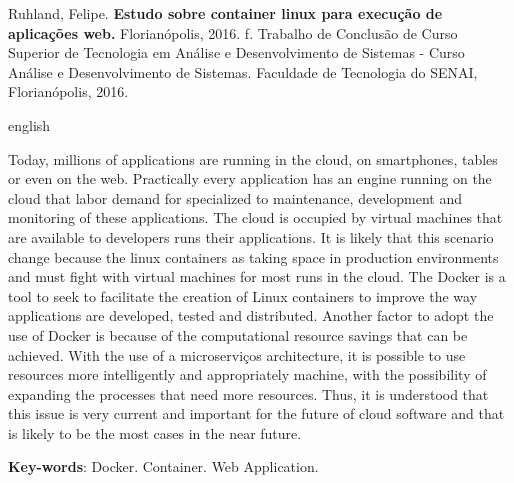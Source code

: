 \noindent
Ruhland, Felipe. \textbf{Estudo sobre container linux para execução de aplicações web.}
Florianópolis, 2016. \pageref{nropaginas}f. Trabalho de Conclusão de Curso Superior de Tecnologia em
Análise e Desenvolvimento de Sistemas - Curso Análise e Desenvolvimento de Sistemas. Faculdade de Tecnologia do
SENAI, Florianópolis, 2016.

\vspace{1cm}
\begin{resumo}
 \begin{otherlanguage*}{english}

Today, millions of applications are running in the cloud, on smartphones, tables or even on the web. Practically every application has an engine running on the cloud that labor demand for specialized to maintenance, development and monitoring of these applications. The cloud is occupied by virtual machines that are available to developers runs their applications. It is likely that this scenario change because the linux containers as taking space in production environments and must fight with virtual machines for most runs in the cloud. The Docker is a tool to seek to facilitate the creation of Linux containers to improve the way applications are developed, tested and distributed. Another factor to adopt the use of Docker is because of the computational resource savings that can be achieved. With the use of a microserviços architecture, it is possible to use resources more intelligently and appropriately machine, with the possibility of expanding the processes that need more resources. Thus, it is understood that this issue is very current and important for the future of cloud software and that is likely to be the most cases in the near future.
   \vspace{\onelineskip}
 
   \noindent 
   \textbf{Key-words}: Docker. Container. Web Application.
 \end{otherlanguage*}
\end{resumo}

